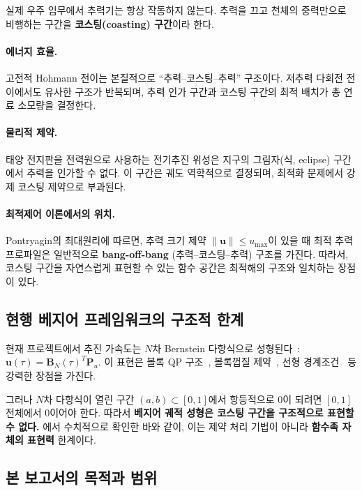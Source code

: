 \documentclass[11pt]{article}
\begin{document}
실제 우주 임무에서 추력기는 항상 작동하지 않는다.
추력을 끄고 천체의 중력만으로 비행하는 구간을 \textbf{코스팅(coasting) 구간}이라 한다.

\paragraph{에너지 효율.}
고전적 Hohmann 전이는 본질적으로 ``추력--코스팅--추력'' 구조이다.
저추력 다회전 전이에서도 유사한 구조가 반복되며,
추력 인가 구간과 코스팅 구간의 최적 배치가 총 연료 소모량을 결정한다.

\paragraph{물리적 제약.}
태양 전지판을 전력원으로 사용하는 전기추진 위성은
지구의 그림자(식, eclipse) 구간에서 추력을 인가할 수 없다.
이 구간은 궤도 역학적으로 결정되며, 최적화 문제에서 강제 코스팅 제약으로 부과된다.

\paragraph{최적제어 이론에서의 위치.}
Pontryagin의 최대원리에 따르면,
추력 크기 제약 $\|\mathbf{u}\| \le u_{\max}$이 있을 때
최적 추력 프로파일은 일반적으로
\textbf{bang-off-bang} (추력--코스팅--추력) 구조를 가진다.
따라서, 코스팅 구간을 자연스럽게 표현할 수 있는 함수 공간은
최적해의 구조와 일치하는 장점이 있다.


\subsection{현행 베지어 프레임워크의 구조적 한계}

현재 프로젝트에서 추진 가속도는 $N$차 Bernstein 다항식으로 성형된다~\cite{report003}:
$\mathbf{u}(\tau) = \mathbf{B}_N(\tau)^T \mathbf{P}_u$.
이 표현은 볼록 QP 구조~\cite{report004}, 볼록껍질 제약~\cite{report005},
선형 경계조건~\cite{report006} 등 강력한 장점을 가진다.

그러나 $N$차 다항식이 열린 구간 $(a,b) \subset [0,1]$에서
항등적으로 0이 되려면 $[0,1]$ 전체에서 0이어야 한다.
따라서 \textbf{베지어 궤적 성형은 코스팅 구간을 구조적으로 표현할 수 없다.}
\cite{efc002}에서 수치적으로 확인한 바와 같이,
이는 제약 처리 기법이 아니라 \textbf{함수족 자체의 표현력} 한계이다.


\subsection{본 보고서의 목적과 범위}
\end{document}
